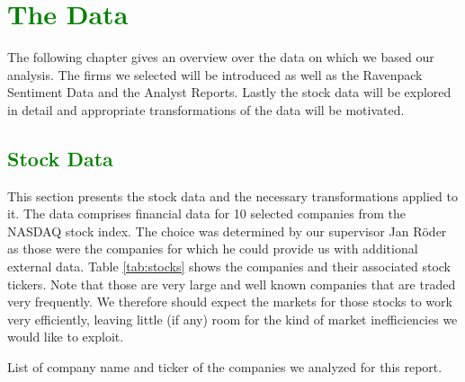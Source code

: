 \chapter{\textcolor{green}{The Data}} \label{ch:data}
The following chapter gives an overview over the data on which we based our analysis. The firms we selected will be introduced as well as the Ravenpack Sentiment Data and the Analyst Reports. Lastly the stock data will be explored in detail and appropriate transformations of the data will be motivated. 
\section{\textcolor{green}{Stock Data}}
This section presents the stock data and the necessary transformations applied to it. The data comprises financial data for 10 selected companies from the NASDAQ stock index. The choice was determined by our supervisor Jan Röder as those were the companies for which he could provide us with additional external data. Table \ref{tab:stocks} shows the companies and their associated stock tickers. Note that those are very large and well known companies that are traded very frequently. We therefore should expect the markets for those stocks to work very efficiently, leaving little (if any) room for the kind of market inefficiencies we would like to exploit. 
\begin{table}[h!]
    \centering
    \begin{adjustbox}{width = 0.4\linewidth}
    \small
    
    \end{adjustbox}
    \caption{List of company name and ticker of the companies we analyzed for this report.}
    \label{tab:stocks}
\end{table}

